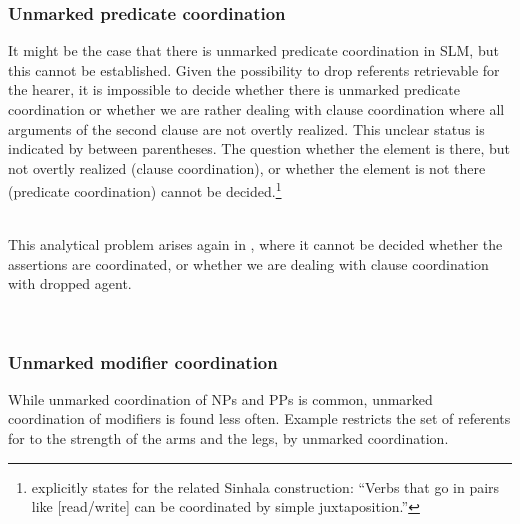 \subsubsection[Predicate]{Unmarked predicate coordination}\label{sec:constr:Unmarkedpredicatecoordination}
It might be the case that there is unmarked predicate coordination in SLM, but this cannot be established.
Given the possibility to drop referents retrievable for the hearer, it is impossible to decide whether there is unmarked predicate coordination or whether we are rather dealing with clause coordination where all arguments of the second clause are not overtly realized. This unclear status is indicated by \zero{} between parentheses. The question whether the element is there, but not overtly realized (clause coordination), or whether the element is not there (predicate coordination) cannot be decided.\footnote{\citet[206]{Karunatillake2004} explicitly states for the related Sinhala construction: ``Verbs that go in pairs like [read/write] can be coordinated by simple juxtaposition.''}
 
\\

This analytical problem  arises again in , where it cannot be decided whether the assertions are coordinated, or whether we are dealing with clause coordination with dropped agent.


 \\


\subsubsection[Modifier]{Unmarked modifier coordination}\label{sec:constr:Unmarkedmodifiercoordination}
While unmarked coordination of NPs and PPs is common, unmarked coordination of modifiers is found less often. Example   restricts the set of referents for  to the strength of the arms and the legs, by unmarked coordination.

